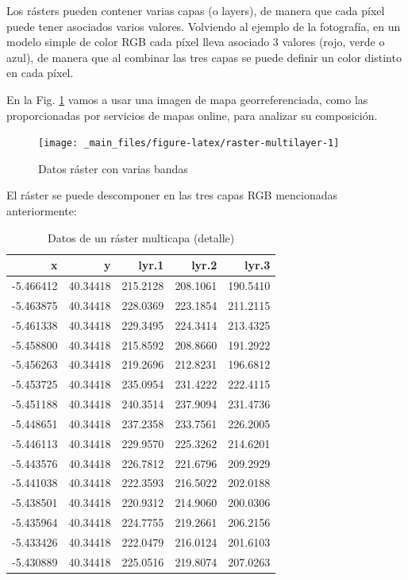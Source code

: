 \documentclass[
]{book}
\begin{document}
Los rásters pueden contener varias capas (o layers), de manera que cada píxel
puede tener asociados varios valores. Volviendo al ejemplo de la fotografía, en
un modelo simple de color RGB cada píxel lleva asociado 3 valores (rojo, verde o
azul), de manera que al combinar las tres capas se puede definir un color
distinto en cada píxel.

En la Fig. \ref{fig:raster-multilayer} vamos a usar una imagen de mapa
georreferenciada, como las proporcionadas por servicios de mapas online, para
analizar su composición.

\begin{figure}

{\centering \texttt{[image: \_main\_files/figure-latex/raster-multilayer-1]} 

}

\caption{Datos ráster con varias bandas}\label{fig:raster-multilayer}
\end{figure}

El ráster se puede descomponer en las tres capas RGB mencionadas anteriormente:

\begin{table}

\caption{\label{tab:detalle-pixel-multicapa}Datos de un ráster multicapa (detalle)}
\centering
\begin{tabular}[t]{r|r|r|r|r}
\hline
x & y & lyr.1 & lyr.2 & lyr.3\\
\hline
-5.466412 & 40.34418 & 215.2128 & 208.1061 & 190.5410\\
\hline
-5.463875 & 40.34418 & 228.0369 & 223.1854 & 211.2115\\
\hline
-5.461338 & 40.34418 & 229.3495 & 224.3414 & 213.4325\\
\hline
-5.458800 & 40.34418 & 215.8592 & 208.8660 & 191.2922\\
\hline
-5.456263 & 40.34418 & 219.2696 & 212.8231 & 196.6812\\
\hline
-5.453725 & 40.34418 & 235.0954 & 231.4222 & 222.4115\\
\hline
-5.451188 & 40.34418 & 240.3514 & 237.9094 & 231.4736\\
\hline
-5.448651 & 40.34418 & 237.2358 & 233.7561 & 226.2005\\
\hline
-5.446113 & 40.34418 & 229.9570 & 225.3262 & 214.6201\\
\hline
-5.443576 & 40.34418 & 226.7812 & 221.6796 & 209.2929\\
\hline
-5.441038 & 40.34418 & 222.3593 & 216.5022 & 202.0188\\
\hline
-5.438501 & 40.34418 & 220.9312 & 214.9060 & 200.0306\\
\hline
-5.435964 & 40.34418 & 224.7755 & 219.2661 & 206.2156\\
\hline
-5.433426 & 40.34418 & 222.0479 & 216.0124 & 201.6103\\
\hline
-5.430889 & 40.34418 & 225.0516 & 219.8074 & 207.0263\\
\hline
\end{tabular}
\end{table}
\end{document}
